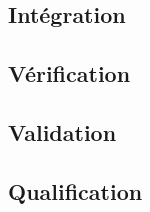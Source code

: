 \AntoineSpeak
\subsection{Intégration}
\begin{frame}
	
\end{frame}

\ZacSpeak
\subsection{Vérification}
\begin{frame}
	
\end{frame}

\SteveSpeak
\subsection{Validation}
\begin{frame}
	
\end{frame}
\subsection{Qualification}
\begin{frame}
	
\end{frame}
